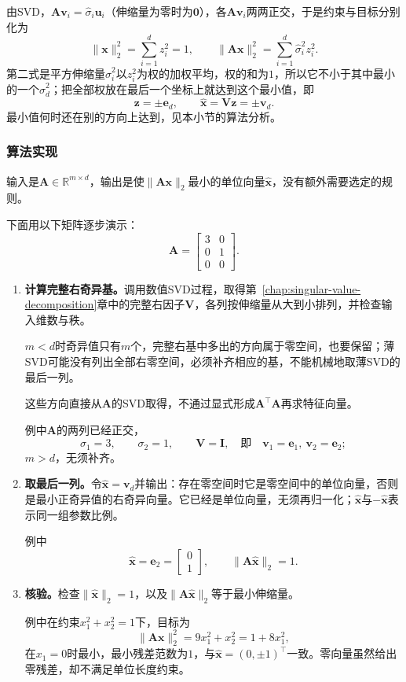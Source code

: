 由SVD，$\bm A\bm v_i=\hat\sigma_i\bm u_i$（伸缩量为零时为$\bm0$），各$\bm A\bm v_i$两两正交，于是约束与目标分别化为
\begin{equation}
 \lVert\bm x\rVert_2^2=\sum_{i=1}^dz_i^2=1,\qquad
 \lVert\bm A\bm x\rVert_2^2=\sum_{i=1}^d\hat\sigma_i^2z_i^2 .
 \label{eq:ls-homogeneous-coordinates}
\end{equation}
第二式是平方伸缩量$\hat\sigma_i^2$以$z_i^2$为权的加权平均，权的和为$1$，所以它不小于其中最小的一个$\hat\sigma_d^2$；把全部权放在最后一个坐标上就达到这个最小值，即
\begin{equation}
 \bm z=\pm\bm e_d,\qquad \hat{\bm x}=\bm V\bm z=\pm\bm v_d .
 \label{eq:ls-homogeneous-solution}
\end{equation}
最小值何时还在别的方向上达到，见本小节的算法分析。

\subsubsection{算法实现}
输入是$\bm A\in\mathbb R^{m\times d}$，输出是使$\lVert\bm A\bm x\rVert_2$最小的单位向量$\hat{\bm x}$，没有额外需要选定的规则。

下面用以下矩阵逐步演示：
\[
 \bm A=\begin{bmatrix}3&0\\0&1\\0&0\end{bmatrix}.
\]

\begin{enumerate}
 \item \textbf{计算完整右奇异基。}调用数值SVD过程，取得第~\ref{chap:singular-value-decomposition}章中的完整右因子$\bm V$，各列按伸缩量从大到小排列，并检查输入维数与秩。
 
 $m<d$时奇异值只有$m$个，完整右基中多出的方向属于零空间，也要保留；薄SVD可能没有列出全部右零空间，必须补齐相应的基，不能机械地取薄SVD的最后一列。
 
 这些方向直接从$\bm A$的SVD取得，不通过显式形成$\bm A^\top\bm A$再求特征向量。
 
 例中$\bm A$的两列已经正交，
 \[
  \sigma_1=3,\qquad \sigma_2=1,\qquad \bm V=\bm I,\quad\text{即}\quad \bm v_1=\bm e_1,\ \bm v_2=\bm e_2 ;
 \]
 $m>d$，无须补齐。

 \item \textbf{取最后一列。}令$\hat{\bm x}=\bm v_d$并输出：存在零空间时它是零空间中的单位向量，否则是最小正奇异值的右奇异向量。它已经是单位向量，无须再归一化；$\hat{\bm x}$与$-\hat{\bm x}$表示同一组参数比例。

 例中
 \[
  \hat{\bm x}=\bm e_2=\begin{bmatrix}0\\1\end{bmatrix},\qquad
  \lVert\bm A\hat{\bm x}\rVert_2=1 .
 \]

 \item \textbf{核验。}检查$\lVert\hat{\bm x}\rVert_2=1$，以及$\lVert\bm A\hat{\bm x}\rVert_2$等于最小伸缩量。

 例中在约束$x_1^2+x_2^2=1$下，目标为
 \[
  \lVert\bm A\bm x\rVert_2^2=9x_1^2+x_2^2=1+8x_1^2 ,
 \]
 在$x_1=0$时最小，最小残差范数为$1$，与$\hat{\bm x}=(0,\pm1)^\top$一致。零向量虽然给出零残差，却不满足单位长度约束。
\end{enumerate}

